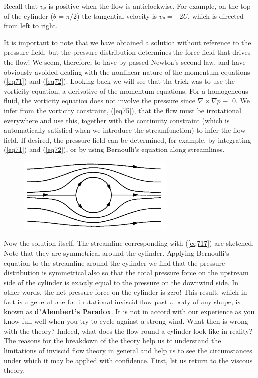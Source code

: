 \documentclass[twoside,a4paper,11pt]{report}
\begin{document}
Recall that $v_{\theta }$ is positive when the flow is anticlockwise. For
example, on the top of the cylinder ($\theta =\pi /2$) the tangential velocity
is $v_{\theta } = -2U$, which is directed from left to right.

It is important to note that we have obtained a solution without reference to
the pressure field, but the pressure distribution determines the force field
that drives the flow! We seem, therefore, to have by-passed Newton's second
law, and have obviously avoided dealing with the nonlinear nature of the
momentum equations (\ref{eq71}) and (\ref{eq72}). Looking back we will see
that the trick was to use the vorticity equation, a derivative of the momentum
equations. For a homogeneous fluid, the vorticity equation does not involve
the pressure since $\nabla \times \nabla p \equiv $ 0. We infer from the
vorticity constraint, (\ref{eq75}), that the flow must be irrotational
everywhere and use this, together with the continuity constraint (which is
automatically satisfied when we introduce the streamfunction) to infer the
flow field. If desired, the pressure field can be determined, for example, by
integrating (\ref{eq71}) and (\ref{eq72}), or by using Bernoulli's equation
along streamlines.

\newpage
\begin{figure}
\centerline{\includegraphics[width=3in]{Section74.pdf}}
\label{fig4}
\end{figure}

Now the solution itself. The streamline corresponding with (\ref{eq717}) are 
sketched. Note that they are symmetrical around the cylinder. Applying 
Bernoulli's equation to the streamline around the cylinder we find that the 
pressure distribution is symmetrical also so that the total pressure force 
on the upstream side of the cylinder is exactly equal to the pressure on the 
downwind side. In other words, the net pressure force on the cylinder is 
zero! This result, which in fact is a general one for irrotational inviscid 
flow past a body of any shape, is known as \textbf{d'Alembert's Paradox}. It 
is not in accord with our experience as you know full well when you try to 
cycle against a strong wind. What then is wrong with the theory? Indeed, 
what does the flow round a cylinder look like in reality? The reasons for 
the breakdown of the theory help us to understand the limitations of 
inviscid flow theory in general and help us to see the circumstances under 
which it may be applied with confidence. First, let us return to the viscous 
theory.
\end{document}
